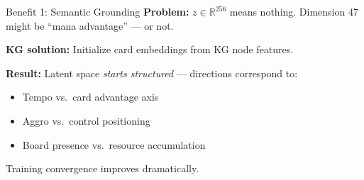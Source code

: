 \documentclass[aspectratio=169, 11pt]{beamer}
\begin{document}
\begin{frame}{Benefit 1: Semantic Grounding}
  \textbf{Problem:} $z \in \mathbb{R}^{256}$ means nothing.
  Dimension 47 might be ``mana advantage'' --- or not.
  \vspace{0.3cm}

  \textbf{KG solution:} Initialize card embeddings from KG node features.
  \vspace{0.3cm}

  \begin{center}
  \end{center}
  \vspace{0.4cm}

  \textbf{Result:} Latent space \textit{starts structured} --- directions correspond to:
  \begin{itemize}
    \item Tempo vs.\ card advantage axis
    \item Aggro vs.\ control positioning
    \item Board presence vs.\ resource accumulation
  \end{itemize}
  \vspace{0.2cm}
  \begin{center}Training convergence improves dramatically.\end{center}
\end{frame}
\end{document}
